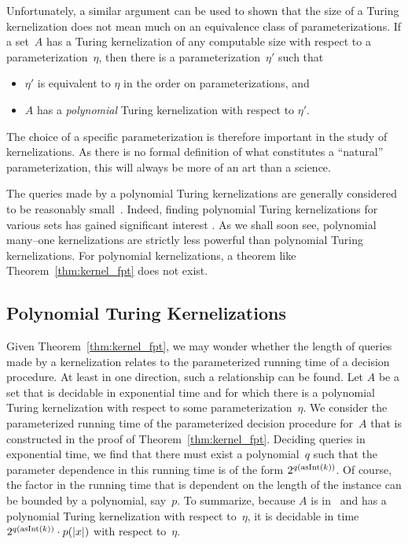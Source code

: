 Unfortunately, a similar argument can be used to shown that the size of a Turing kernelization does not mean much on an equivalence class of parameterizations.
If a set~$A$ has a Turing kernelization of any computable size with respect to a parameterization~$\eta$, then there is a parameterization~$\eta'$ such that
\begin{itemize}
\item $\eta'$ is equivalent to $\eta$ in the order on parameterizations, and
\item $A$ has a \emph{polynomial} Turing kernelization with respect to $\eta'$.
\end{itemize}
The choice of a specific parameterization is therefore important in the study of kernelizations.
As there is no formal definition of what constitutes a \enquote{natural} parameterization, this will always be more of an art than a science.

The queries made by a polynomial Turing kernelizations are generally considered to be reasonably small~\parencite{flum2006parameterized}.
Indeed, finding polynomial Turing kernelizations for various sets has gained significant interest \parencite{guo2007invitation,cygan2015parameterized,fomin2019kernelization}.
As we shall soon see, polynomial many--one kernelizations are strictly less powerful than polynomial Turing kernelizations.
For polynomial kernelizations, a theorem like Theorem~\ref{thm:kernel_fpt} does not exist.

\subsection{Polynomial Turing Kernelizations}
\label{sec:redundancy:polynomial}%
Given Theorem~\ref{thm:kernel_fpt}, we may wonder whether the length of queries made by a kernelization relates to the parameterized running time of a decision procedure.
At least in one direction, such a relationship can be found.
Let $A$ be a set that is decidable in exponential time and for which there is a polynomial Turing kernelization with respect to some parameterization~$\eta$.
We consider the parameterized running time of the parameterized decision procedure for~$A$ that is constructed in the proof of Theorem~\ref{thm:kernel_fpt}.
Deciding queries in exponential time, we find that there must exist a polynomial~$q$ such that the parameter dependence in this running time is of the form $2^{q(\operatorname{asInt}(k))}$.
Of course, the factor in the running time that is dependent on the length of the instance can be bounded by a polynomial, say~$p$.
To summarize, because $A$ is in~ and has a polynomial Turing kernelization with respect to~$\eta$, it is decidable in time $2^{q(\operatorname{asInt}(k))} \cdot p({\lvert x\rvert})$ with respect to~$\eta$.

